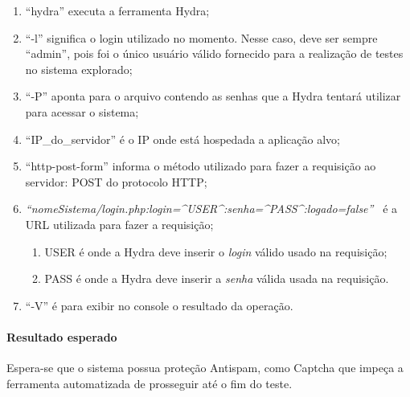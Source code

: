 \documentclass[
    12pt,               %
    openright,          %
    oneside,            %
    a4paper,            %
    section=TITLE,     %
    english,            %
    french,             %
    spanish,            %
    brazil              %
    ]{abntex2}
\begin{document}
\begin{enumerate}[start=1]
	
\item \textquotedblleft{}hydra\textquotedblright{} executa a ferramenta Hydra;
	
\item \textquotedblleft{}-l\textquotedblright{} significa o login utilizado no momento. Nesse caso, deve ser sempre \textquotedblleft{}admin\textquotedblright{}, pois foi o único usuário válido fornecido para a realização de testes no sistema explorado;
	
\item \textquotedblleft{}-P\textquotedblright{} aponta para o arquivo contendo as senhas que a Hydra tentará utilizar para acessar o sistema;
	
\item \textquotedblleft{}IP\_do\_servidor\textquotedblright{} é o IP onde está hospedada a aplicação alvo;
	
\item \textquotedblleft{}http-post-form\textquotedblright{} informa o método utilizado para fazer a requisição ao servidor: POST do protocolo HTTP;
	
\item \emph{\textquotedblleft{}nomeSistema/login.php:login=\^{}USER\^{}:senha=\^{}PASS\^{}:logado=false\textquotedblright{}~ }é a URL utilizada para fazer a requisição;
	
\begin{enumerate}[start=1]
		
\item USER é onde a Hydra deve inserir o \emph{login} válido usado na requisição;
		
\item PASS é onde a Hydra deve inserir a \emph{senha} válida usada na requisição.
	
\end{enumerate}
	
	
\item \textquotedblleft{}-V\textquotedblright{} é para exibir no console o resultado da operação.

\end{enumerate}


\paragraph*{Resultado esperado}

Espera-se que o sistema possua proteção Antispam, como Captcha que impeça a ferramenta automatizada de prosseguir até o fim do teste.
\end{document}
